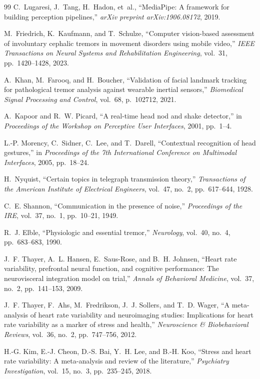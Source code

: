\documentclass[12pt,a4paper,oneside]{report}
\begin{document}
\begin{thebibliography}{99}
C.~Lugaresi, J.~Tang, H.~Hadon, et~al., ``MediaPipe: A framework for building perception pipelines,'' \emph{arXiv preprint arXiv:1906.08172}, 2019.

M.~Friedrich, K.~Kaufmann, and T.~Schulze, ``Computer vision-based assessment of involuntary cephalic tremors in movement disorders using mobile video,'' \emph{IEEE Transactions on Neural Systems and Rehabilitation Engineering}, vol.~31, pp.~1420--1428, 2023.

A.~Khan, M.~Farooq, and H.~Boucher, ``Validation of facial landmark tracking for pathological tremor analysis against wearable inertial sensors,'' \emph{Biomedical Signal Processing and Control}, vol.~68, p.~102712, 2021.

A.~Kapoor and R.~W. Picard, ``A real-time head nod and shake detector,'' in \emph{Proceedings of the Workshop on Perceptive User Interfaces}, 2001, pp.~1--4.

L.-P. Morency, C.~Sidner, C.~Lee, and T.~Darell, ``Contextual recognition of head gestures,'' in \emph{Proceedings of the 7th International Conference on Multimodal Interfaces}, 2005, pp.~18--24.

H.~Nyquist, ``Certain topics in telegraph transmission theory,'' \emph{Transactions of the American Institute of Electrical Engineers}, vol.~47, no.~2, pp.~617--644, 1928.

C.~E. Shannon, ``Communication in the presence of noise,'' \emph{Proceedings of the IRE}, vol.~37, no.~1, pp.~10--21, 1949.

R.~J. Elble, ``Physiologic and essential tremor,'' \emph{Neurology}, vol.~40, no.~4, pp.~683--683, 1990.

J.~F. Thayer, A.~L. Hansen, E.~Saus-Rose, and B.~H. Johnsen, ``Heart rate variability, prefrontal neural function, and cognitive performance: The neurovisceral integration model on trial,'' \emph{Annals of Behavioral Medicine}, vol.~37, no.~2, pp.~141--153, 2009.

J.~F. Thayer, F.~Ahs, M.~Fredrikson, J.~J. Sollers, and T.~D. Wager, ``A meta-analysis of heart rate variability and neuroimaging studies: Implications for heart rate variability as a marker of stress and health,'' \emph{Neuroscience \& Biobehavioral Reviews}, vol.~36, no.~2, pp.~747--756, 2012.

H.-G. Kim, E.-J. Cheon, D.-S. Bai, Y.~H. Lee, and B.-H. Koo, ``Stress and heart rate variability: A meta-analysis and review of the literature,'' \emph{Psychiatry Investigation}, vol.~15, no.~3, pp.~235--245, 2018.


\end{thebibliography}
\end{document}
